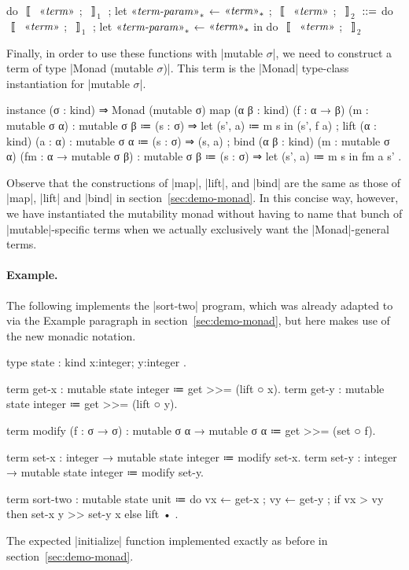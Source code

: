 \begin{notational}[caption={Notation for binding within \code|do| block}]
do{ $〚$ $\mvar{term}$ ; $〛_1$ ; let $\mvar{term-param}_*$ ← $\mvar{term}_*$ ; $〚$ $\mvar{term}$ ; $〛_2$ }
  $\syneq$
    do{ $〚$ $\mvar{term}$ ; $〛_1$ ; let $\mvar{term-param}_*$ ← $\mvar{term}_*$ in do{ $〚$ $\mvar{term}$ ; $〛_2$ } }
\end{notational}

Finally, in order to use these functions with \code|mutable $σ$|, we need to construct a term of type \code|Monad (mutable $σ$)|.
This term is the \code|Monad| type-class instantiation for \code|mutable $σ$|.
\begin{program}[caption={Instance of the mutable monad}]
instance (σ : kind) ⇒ Monad (mutable σ)
  { map (α β : kind) (f : α → β) (m : mutable σ α) : mutable σ β
      ≔ (s : σ) ⇒
          let (s', a) ≔ m s in
          (s', f a)
  ; lift (α : kind) (a : α) : mutable σ α
      ≔ (s : σ) ⇒ (s, a)
  ; bind (α β : kind) (m : mutable σ α) (fm : α → mutable σ β)
      : mutable σ β
      ≔ (s : σ) ⇒
          let (s', a) ≔ m s in
          fm a s' }.
\end{program}
Observe that the constructions of \code|map|, \code|lift|, and \code|bind| are the same as those of \code|map|, \code|lift| and \code|bind| in section~\ref{sec:demo-monad}.
In this concise way, however, we have instantiated the mutability monad without having to name that bunch of \code|mutable|-specific terms when we actually exclusively want the \code|Monad|-general terms.

\newpage
\paragraph{Example.}
The following implements the \code|sort-two| program, which was already adapted to \LangC via the Example paragraph in section~\ref{sec:demo-monad}, but here makes use of the new monadic notation.
%
\begin{snippet}
type state : kind { x:integer; y:integer }.

term get-x : mutable state integer ≔ get >>= (lift ○ x).
term get-y : mutable state integer ≔ get >>= (lift ○ y).

term modify (f : σ → σ) : mutable σ α → mutable σ α
  ≔ get >>= (set ○ f).

term set-x : integer → mutable state integer ≔ modify set-x.
term set-y : integer → mutable state integer ≔ modify set-y.

term sort-two : mutable state unit
  ≔ do
      { vx ← get-x
      ; vy ← get-y
      ; if vx > vy
          then set-x y >> set-y x
          else lift • }.
\end{snippet}
%
The expected \code|initialize| function implemented exactly as before in section~\ref{sec:demo-monad}.

